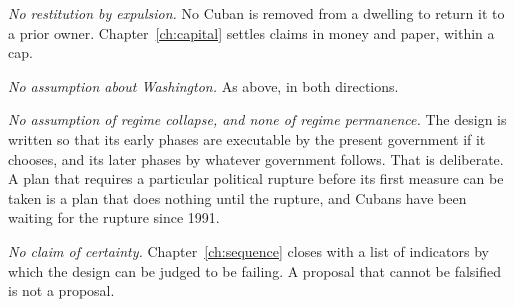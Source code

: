 \emph{No restitution by expulsion.} No Cuban is removed from a dwelling to
return it to a prior owner. Chapter~\ref{ch:capital} settles claims in money and
paper, within a cap.

\emph{No assumption about Washington.} As above, in both directions.

\emph{No assumption of regime collapse, and none of regime permanence.} The
design is written so that its early phases are executable by the present
government if it chooses, and its later phases by whatever government follows.
That is deliberate. A plan that requires a particular political rupture before
its first measure can be taken is a plan that does nothing until the rupture,
and Cubans have been waiting for the rupture since 1991.

\emph{No claim of certainty.} Chapter~\ref{ch:sequence} closes with a list of
indicators by which the design can be judged to be failing. A proposal that
cannot be falsified is not a proposal.
